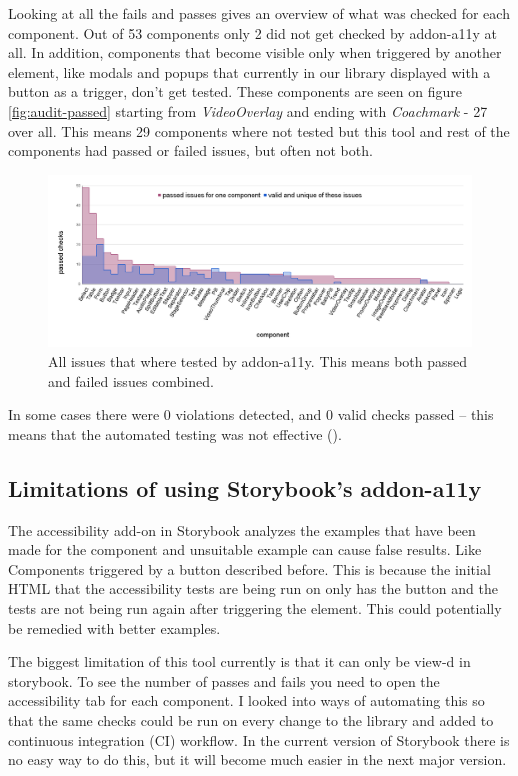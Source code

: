 \documentclass{master_thesis}
\begin{document}
Looking at all the fails and passes gives an overview of what was checked for each component. Out of 53 components only 2 did not get checked by addon-a11y at all. In addition, components that become visible only when triggered by another element, like modals and popups that currently in our library displayed with a button as a trigger, don't get tested. These components are seen on figure \ref{fig:audit-passed} starting from \textit{VideoOverlay} and ending with \textit{Coachmark} - 27 over all. This means 29 components where not tested but this tool and rest of the components had passed or failed issues, but often not both.

\begin{figure}[H]
	\includegraphics[width=\textwidth]{img/audit-all.png}
	\caption{All issues that where tested by addon-a11y. This means both passed and failed issues combined.}
	\label{fig:audit-all}
\end{figure}

In some cases there were 0 violations detected, and 0 valid checks passed – this means that the automated testing was not effective ().

\subsection{Limitations of using Storybook's addon-a11y}

The accessibility add-on in Storybook analyzes the examples that have been made for the component and unsuitable example can cause false results. Like Components triggered by a button described before. This is because the initial HTML that the accessibility tests are being run on only has the button and the tests are not being run again after triggering the element. This could potentially be remedied with better examples.

The biggest limitation of this tool currently is that it can only be view-d in storybook. To see the number of passes and fails you need to open the accessibility tab for each component. I looked into ways of automating this so that the same checks could be run on every change to the library and added to continuous integration (CI) workflow. In the current version of Storybook there is no easy way to do this, but it will become much easier in the next major version.
\end{document}
